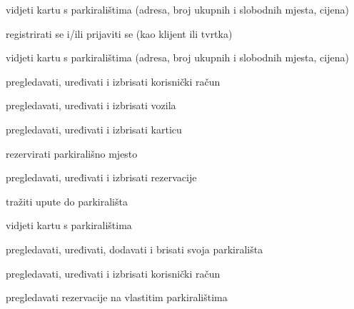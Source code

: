 \begin{packed_enum}
	\item  {}
	
	\begin{packed_enum}
		
		\item vidjeti kartu s parkiralištima (adresa, broj ukupnih i slobodnih mjesta, cijena)
		\item registrirati se i/ili prijaviti se (kao klijent ili tvrtka)
		
	\end{packed_enum}
	
	\item  {}
	
	\begin{packed_enum}
		
		\item vidjeti kartu s parkiralištima (adresa, broj ukupnih i slobodnih mjesta, cijena)
		\item pregledavati, uređivati i izbrisati korisnički račun
		\item pregledavati, uređivati i izbrisati vozila
		\item pregledavati, uređivati i izbrisati karticu
		\item rezervirati parkirališno mjesto
		\item pregledavati, uređivati i izbrisati rezervacije
		\item tražiti upute do parkirališta
		
	\end{packed_enum}
	
	
	\item  {}
	
	\begin{packed_enum}
		
		\item vidjeti kartu s parkiralištima
		\item pregledavati, uređivati, dodavati i brisati svoja parkirališta
		\item pregledavati, uređivati i izbrisati korisnički račun
		\item pregledavati rezervacije na vlastitim parkiralištima
		
	\end{packed_enum}
	
	\item {}
	

\end{packed_enum}
